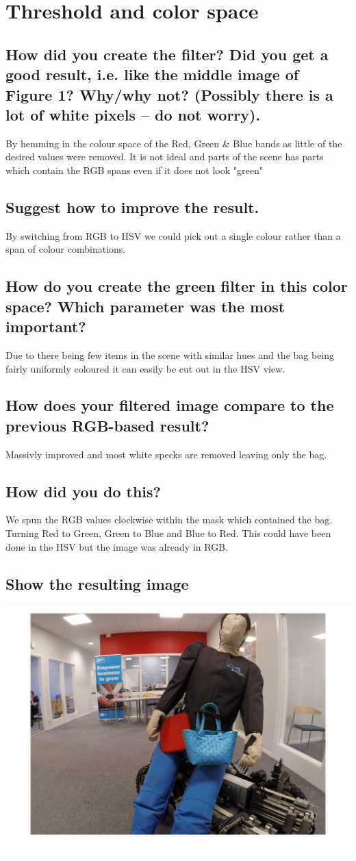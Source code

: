 \section{Threshold and color space}
\subsection{How did you create the filter? Did you get a good result, i.e. like the middle image of Figure 1? Why/why not? (Possibly there is a lot of white pixels – do not worry).}
By hemming in the colour space of the Red, Green \& Blue bands as little of the desired values were removed. It is not ideal and parts of the scene has parts which contain the RGB spans even if it does not look "green"
\subsection{Suggest how to improve the result.}
By switching from RGB to HSV we could pick out a single colour rather than a span of colour combinations.
\subsection{How do you create the green filter in this color space? Which parameter was the most important?}
Due to there being few items in the scene with similar hues and the bag being fairly uniformly coloured it can easily be cut out in the HSV view.
\subsection{How does your filtered image compare to the previous RGB-based result?}
Massivly improved and most white specks are removed leaving only the bag.
\subsection{How did you do this?}
We spun the RGB values clockwise within the mask which contained the bag. Turning Red to Green, Green to Blue and Blue to Red. This could have been done in the HSV but the image was already in RGB.
\subsection{Show the resulting image}
\includegraphics[width=\textwidth]{./bluebag.jpg}
